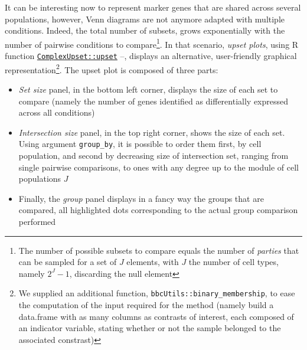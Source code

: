 \begin{Shaded}
\begin{Highlighting}
\OtherTok{\textless{}{-}}\SpecialCharTok{::}\NormalTok{(}
   \NormalTok{)}
\end{Highlighting}
\end{Shaded}

It can be interesting now to represent marker genes that are shared across several populations, however, Venn diagrams are not anymore adapted with multiple conditions. Indeed, the total number of subsets, grows exponentially with the number of pairwise conditions to compare\footnote{The number of possible subsets to compare equals the number of \emph{parties} that can be sampled for a set of \(J\) elements, with \(J\) the number of cell types, namely \(2^J -1\), discarding the null element}. In that scenario, \emph{upset plots}, using R function \href{https://krassowski.github.io/complex-upset/reference/upset.html}{\texttt{ComplexUpset::upset}} \autocite{R-ComplexUpset}--\autocite{ComplexUpset2020}, displays an alternative, user-friendly graphical representation\footnote{We supplied an additional function, \texttt{bbcUtils::binary\_membership}, to ease the computation of the input required for the method (namely build a data.frame with as many columns as contrasts of interest, each composed of an indicator variable, stating whether or not the sample belonged to the associated constrast)}. The upset plot is composed of three parts:

\begin{itemize}
\item
  \emph{Set size} panel, in the bottom left corner, displays the size of each set to compare (namely the number of genes identified as differentially expressed across all conditions)
\item
  \emph{Intersection size} panel, in the top right corner, shows the size of each set. Using argument \texttt{group\_by}, it is possible to order them first, by cell population, and second by decreasing size of intersection set, ranging from single pairwise comparisons, to ones with any degree up to the module of cell populations \(J\)
\item
  Finally, the \emph{group} panel displays in a fancy way the groups that are compared, all highlighted dots corresponding to the actual group comparison performed
\end{itemize}

